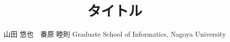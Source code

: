 \documentclass[T]{compsoft}
\begin{document}
\title{タイトル}

%
\author{山田 悠也　番原 睦則
%
%
%
%
%
{Graduate School of Informatics, Nagoya University}}

\Jabstract{%
}


\maketitle \thispagestyle {empty}
\end{document}
